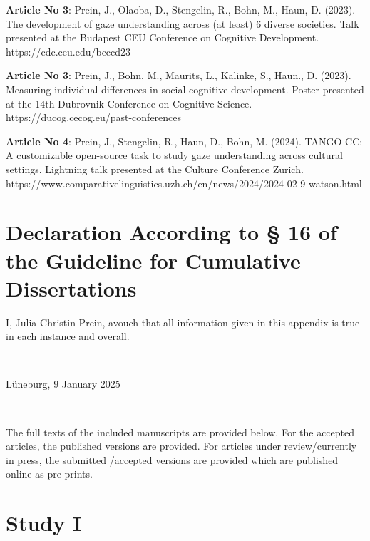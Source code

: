 \documentclass[
]{scrbook}
\begin{document}
\begin{hangparas}{5mm}{1}
\textbf{Article No 3}: Prein, J., Olaoba, D., Stengelin, R., Bohn, M., Haun, D. (2023). The development of gaze understanding across (at least) 6 diverse societies. Talk presented at the Budapest CEU Conference on Cognitive Development. https://cdc.ceu.edu/bcccd23

\textbf{Article No 3}: Prein, J., Bohn, M., Maurits, L., Kalinke, S., Haun., D. (2023). Measuring individual differences in social-cognitive development. Poster presented at the 14th Dubrovnik Conference on Cognitive Science. https://ducog.cecog.eu/past-conferences

\textbf{Article No 4}: Prein, J., Stengelin, R., Haun, D., Bohn, M. (2024). TANGO-CC: A customizable open-source task to study gaze understanding across cultural settings. Lightning talk presented at the Culture Conference Zurich. https://www.comparativelinguistics.uzh.ch/en/news/2024/2024-02-9-watson.html

\end{hangparas}

\newpage

\section*{Declaration According to § 16 of the Guideline for Cumulative Dissertations}\label{declaration-according-to-16-of-the-guideline-for-cumulative-dissertations}

I, Julia Christin Prein, avouch that all information given in this appendix is true in each instance and overall.

~
~
~
~

Lüneburg, 9 January 2025

~
~
~

The full texts of the included manuscripts are provided below. For the accepted articles, the published versions are provided. For articles under review/currently in press, the submitted /accepted versions are provided which are published online as pre-prints.

\newpage

\section*{Study I}\label{studyI}

\begin{minipage}{\textwidth}

\end{minipage}
\end{document}
